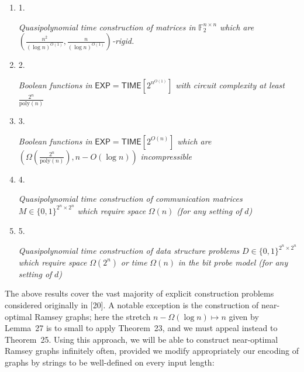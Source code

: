 \documentclass[10pt,a4paper]{article}
\begin{document}
\begin{enumerate}


\item[] 
1. 


\emph{Quasipolynomial time construction of matrices in }$\mathbb{F}_{2}^{n\times n}$\emph{ which are }$(\frac{n^{2}}{(\log n)^{O(1)}},\frac{n}{(\log n)^{O(1)}})$\emph{-rigid.}\par





\item[] 
2. 


\emph{Boolean functions in }$\mathsf{EXP}={\mathsf{TIME}}[2^{n^{O(1)}}]$\emph{ with circuit complexity at least }$\frac{2^{n}}{\mathrm{poly}(n)}$\emph{}\par





\item[] 
3. 


\emph{Boolean functions in }$\mathsf{EXP}={\mathsf{TIME}}[2^{O(n)}]$\emph{ which are }${(\Omega(\frac{2^{n}}{\mathrm{poly}(n)}),n-O(\log n))}$\emph{ incompressible}\par





\item[] 
4. 


\emph{Quasipolynomial time construction of communication matrices }$M\in\{0,1\}^{2^{n}\times 2^{n}}$\emph{ which require space }$\Omega(n)$\emph{ (for any setting of }$d$\emph{)}\par





\item[] 
5. 


\emph{Quasipolynomial time construction of data structure problems }$D\in\{0,1\}^{2^{n}\times 2^{n}}$\emph{ which require space }$\Omega(2^{n})$\emph{ or time }$\Omega(n)$\emph{ in the bit probe model (for any setting of }$d$\emph{)}\par





\end{enumerate}






The above results cover the vast majority of explicit construction problems considered originally in [20]. A notable exception is the construction of near-optimal Ramsey graphs; here the stretch $n-\Omega(\log n)\mapsto n$ given by Lemma 27 is to small to apply Theorem 23, and we must appeal instead to Theorem 25. Using this approach, we will be able to construct near-optimal Ramsey graphs infinitely often, provided we modify appropriately our encoding of graphs by strings to be well-defined on every input length:\par
\end{document}
